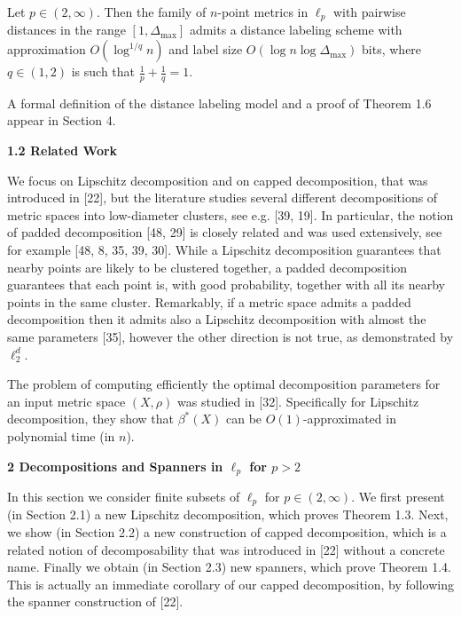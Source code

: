 \documentclass[10pt,a4paper]{amsart}
\begin{document}
Let $p\in(2,\infty)$. Then the family of $n$-point metrics in $\ell_{p}$ with pairwise distances in the range $[1,\Delta_{\text{max}}]$ admits a distance labeling scheme with approximation $O(\log^{1/q}{n})$ and label size $O(\log{n}\log{\Delta_{\text{max}}})$ bits, where $q\in(1,2)$ is such that $\frac{1}{p}+\frac{1}{q}=1$.
\par
\par
\par
A formal definition of the distance labeling model and a proof of Theorem 1.6 appear in Section 4.
\par
\par
\par
\par
\par\medskip\noindent\textbf{1.2 Related Work}\par
We focus on Lipschitz decomposition and on capped decomposition, that was introduced in [22], but the literature studies several different decompositions of metric spaces into low-diameter clusters, see e.g. [39, 19]. In particular, the notion of padded decomposition [48, 29] is closely related and was used extensively, see for example [48, 8, 35, 39, 30]. While a Lipschitz decomposition guarantees that nearby points are likely to be clustered together, a padded decomposition guarantees that each point is, with good probability, together with all its nearby points in the same cluster. Remarkably, if a metric space admits a padded decomposition then it admits also a Lipschitz decomposition with almost the same parameters [35], however the other direction is not true, as demonstrated by $\ell_{2}^{d}$.
\par
\par
The problem of computing efficiently the optimal decomposition parameters for an input metric space $(X,\rho)$ was studied in [32]. Specifically for Lipschitz decomposition, they show that $\beta^{*}(X)$ can be $O(1)$-approximated in polynomial time (in $n$).
\par
\par
\par
\par\medskip\noindent\textbf{2 Decompositions and Spanners in $\ell_{p}$ for $p>2$}\par
In this section we consider finite subsets of $\ell_{p}$ for $p\in(2,\infty)$. We first present (in Section 2.1) a new Lipschitz decomposition, which proves Theorem 1.3. Next, we show (in Section 2.2) a new construction of capped decomposition, which is a related notion of decomposability that was introduced in [22] without a concrete name. Finally we obtain (in Section 2.3) new spanners, which prove Theorem 1.4. This is actually an immediate corollary of our capped decomposition, by following the spanner construction of [22].
\end{document}
